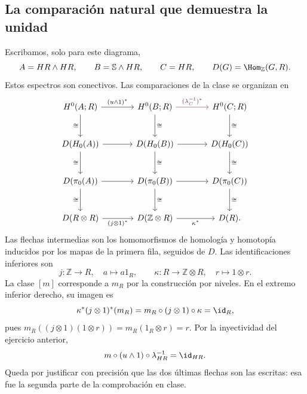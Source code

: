 \subsection{La comparación natural que demuestra la unidad}
Escribamos, solo para este diagrama,
\[
A=HR\wedge HR,\qquad B=\mathbb S\wedge HR,\qquad C=HR,
\qquad D(G)=\Hom_{\mathbb Z}(G,R).
\]
Estos espectros son conectivos. Las comparaciones de la clase se organizan en
\[
\begin{tikzcd}[column sep=large,row sep=large]
H^0(A;R)\arrow[r,"(u\wedge1)^*"]\arrow[d,"\cong"']&
H^0(B;R)\arrow[r,"(\lambda_C^{-1})^*",rojoCIMAT]\arrow[d,"\cong"]&H^0(C;R)\arrow[d,"\cong"]\\
D(H_0(A))\arrow[r]\arrow[d,"\cong"']&D(H_0(B))\arrow[r]\arrow[d,"\cong"]&D(H_0(C))\arrow[d,"\cong"]\\
D(\pi_0(A))\arrow[r]\arrow[d,"\cong"']&D(\pi_0(B))\arrow[r]\arrow[d,"\cong"]&D(\pi_0(C))\arrow[d,"\cong"]\\
D(R\otimes R)\arrow[r,"(j\otimes1)^*"']&D(\mathbb Z\otimes R)\arrow[r,"\kappa^*"']&D(R).
\end{tikzcd}
\]
Las flechas intermedias son los homomorfismos de homología y homotopía inducidos por los mapas de la primera fila, seguidos de $D$. Las identificaciones inferiores son
\[
j\colon\mathbb Z\longrightarrow R,\quad a\longmapsto a1_R,
\qquad
\kappa\colon R\longrightarrow\mathbb Z\otimes R,\quad r\longmapsto1\otimes r.
\]
La clase $[m]$ corresponde a $m_R$ por la construcción por niveles. En el extremo inferior derecho, su imagen es
\[
\kappa^*(j\otimes1)^*(m_R)
=m_R\circ(j\otimes1)\circ\kappa=\id_R,
\]
pues $m_R((j\otimes1)(1\otimes r))=m_R(1_R\otimes r)=r$. Por la inyectividad del ejercicio anterior,
\[
m\circ(u\wedge1)\circ\lambda_{HR}^{-1}=\id_{HR}.
\]
Queda por justificar con precisión que las dos últimas flechas son las escritas: esa fue la segunda parte de la comprobación en clase.

